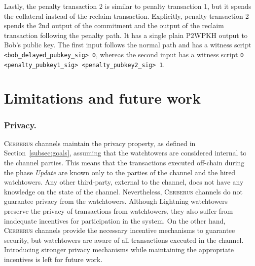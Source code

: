 \documentclass[twocolumn,showpacs,%
  nofootinbib,aps,superscriptaddress,%
  eqsecnum,prd,notitlepage,showkeys,10pt]{revtex4-1}
\newcommand{\sys}{\textsc{Cerberus}\xspace}
\begin{document}
Lastly, the penalty transaction 2 is similar to penalty transaction 1, but it spends the collateral instead of the reclaim transaction. Explicitly, penalty transaction 2 spends the 2nd output of the commitment and the output of the reclaim transaction following the penalty path. It has a single plain P2WPKH output to Bob's public key. The first input follows the normal path and has a witness script \texttt{<bob\_delayed\_pubkey\_sig> 0}, whereas the second input has a witness script \texttt{0 <penalty\_pubkey1\_sig> <penalty\_pubkey2\_sig> 1}.


\section{Limitations and future work}\label{sec:limit}

\subsubsection*{Privacy.}
\sys channels maintain the privacy property, as defined in Section~\ref{subsec:goals}, assuming that the watchtowers are considered internal to the channel parties. This means that the transactions executed off-chain during the phase \textit{Update} are known only to the parties of the channel and the hired watchtowers. Any other third-party, external to the channel, does not have any knowledge on the state of the channel.
Nevertheless, \sys channels do not guarantee privacy from the watchtowers.
Although Lightning watchtowers preserve the privacy of transactions from watchtowers, they also suffer from inadequate incentives for participation in the system. On the other hand, \sys channels provide the necessary incentive mechanisms to guarantee security, but watchtowers are aware of all transactions executed in the channel.
Introducing stronger privacy mechanisms while maintaining the appropriate incentives is left for future work.
\end{document}
